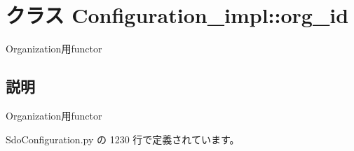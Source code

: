 \section{クラス Configuration\_\-impl::org\_\-id}
\label{classsource__py_1_1_sdo_configuration_1_1_configuration__impl_1_1org__id}
Organization用functor  




\subsection{説明}
Organization用functor 

 SdoConfiguration.py の 1230 行で定義されています。